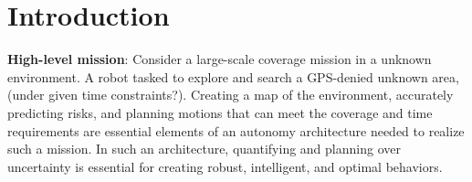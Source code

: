 \documentclass{article}
\newcommand{\ph}[1]{{\textbf{#1}:}} %
\newcommand{\gautam}[1]{{\color{cyan}Gautam: #1 }}
\begin{document}


















\section{Introduction}

\ph{High-level mission} Consider a large-scale coverage mission in a unknown environment. A robot tasked to explore and search a GPS-denied unknown area, (under given time constraints?). Creating a map of the environment, accurately predicting risks, and planning motions that can meet the coverage and time requirements are essential elements of an autonomy architecture needed to realize such a mission.  In such an architecture, quantifying and planning over uncertainty is essential for creating robust, intelligent, and optimal behaviors.
\end{document}

